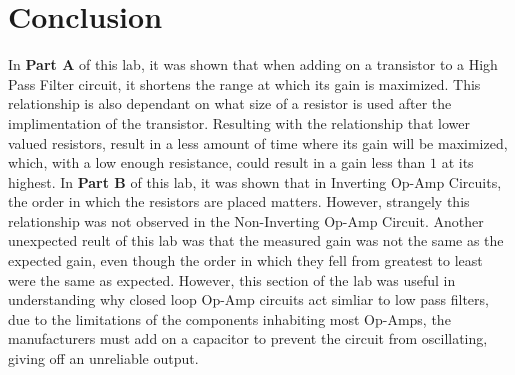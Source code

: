\documentclass[journal]{IEEEtran}
\begin{document}
    \section{\textbf{Conclusion}}
    In \textbf{Part A} of this lab, it was shown that when adding on a transistor to a High Pass 
    Filter circuit, it shortens the range at which its gain is maximized. This relationship is 
    also dependant on what size of a resistor is used after the implimentation of the transistor.
    Resulting with the relationship that lower valued resistors, result in a less amount of time where 
    its gain 
    will be maximized, which, with a low enough resistance, could result in a gain less than $1$ at its highest. In 
    \textbf{Part B} of this lab, it was shown that in Inverting Op-Amp Circuits, the order in 
    which the resistors are placed matters. However, strangely this relationship was not observed
    in the Non-Inverting Op-Amp Circuit. %
    Another unexpected reult of this lab was that the measured gain was not the same as the
    expected gain, even though the order in which they fell from greatest to least were the 
    same as expected. %
    However, this section of the lab was useful in understanding why closed loop Op-Amp circuits
    act simliar to low pass filters, due to the limitations of the components inhabiting most
    Op-Amps, the manufacturers must add on a capacitor to prevent the circuit from oscillating, 
    giving off an unreliable output.
\end{document}
